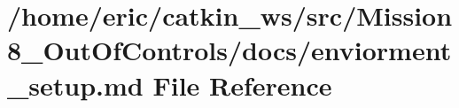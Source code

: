 \hypertarget{Mission8__OutOfControls_2docs_2enviorment__setup_8md}{}\section{/home/eric/catkin\+\_\+ws/src/\+Mission8\+\_\+\+Out\+Of\+Controls/docs/enviorment\+\_\+setup.md File Reference}
\label{Mission8__OutOfControls_2docs_2enviorment__setup_8md}
